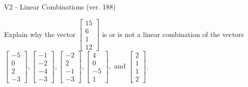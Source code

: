 \begin{exercise}
  \begin{exerciseTitle}V2 - Linear Combinations (ver. 188)\end{exerciseTitle}
  \begin{exerciseStatement}
    Explain why the vector \(\left[\begin{array}{c}
15 \\
6 \\
1 \\
12
\end{array}\right]\)  is or is not a linear 
	combination of the vectors \(\left[\begin{array}{c}
-5 \\
0 \\
2 \\
-3
\end{array}\right] , \left[\begin{array}{c}
-1 \\
-2 \\
-4 \\
-3
\end{array}\right] , \left[\begin{array}{c}
-2 \\
2 \\
-1 \\
-3
\end{array}\right] , \left[\begin{array}{c}
4 \\
0 \\
-5 \\
1
\end{array}\right] , \text{ and } \left[\begin{array}{c}
2 \\
1 \\
1 \\
2
\end{array}\right]\).
	



\end{exerciseStatement}
\end{exercise}
